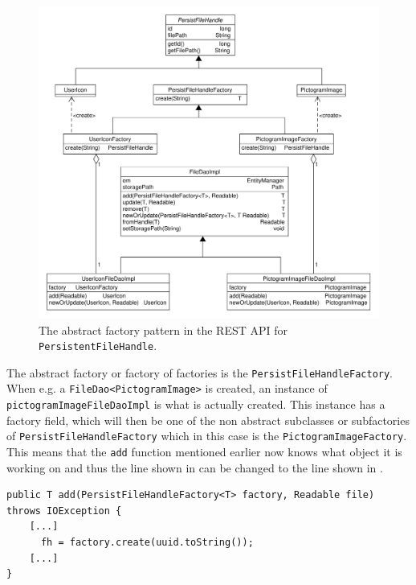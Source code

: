 \begin{figure}[h]
    \centering
    \includegraphics[width=\textwidth]{figures/factorymodel.pdf}
    \caption{The abstract factory pattern in the REST API for \texttt{PersistentFileHandle}.}\label{fig:asbtractFactory}
\end{figure}

The abstract factory or factory of factories is the \texttt{PersistFileHandleFactory}.
When e.g. a \texttt{FileDao<PictogramImage>} is created, an instance of \texttt{pictogramImageFileDaoImpl} is what is actually created.
This instance has a factory field, which will then be one of the non abstract subclasses or subfactories of \texttt{PersistFileHandleFactory} which in this case is the \texttt{PictogramImageFactory}.
This means that the \texttt{add} function mentioned earlier now knows what object it is working on and thus the line shown in  can be changed to the line shown in .

\begin{lstlisting}[float, floatplacement=h, caption={Trying to use a Type Parameter constructor, which Java cannot do. \texttt{[...]} denotes omitted code.},label={lst:TypeParameterConstructorActual}]
public T add(PersistFileHandleFactory<T> factory, Readable file) throws IOException {
    [...]
      fh = factory.create(uuid.toString());
    [...]
}
\end{lstlisting}

